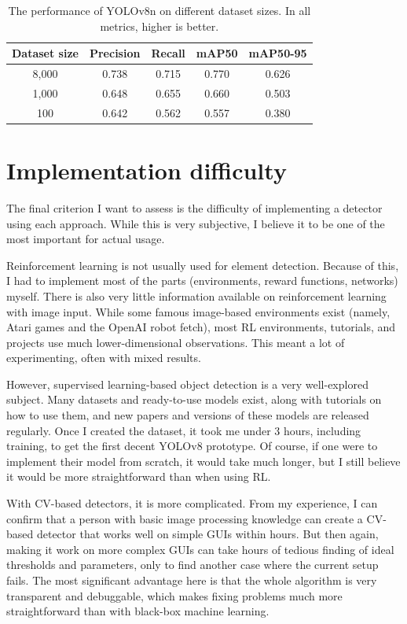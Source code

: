 \documentclass[
  digital,     %
  oneside,     %
  nosansbold,  %
  nocolorbold, %
  lof,         %
  lot,         %
]{fithesis4}
\begin{document}
\begin{table}
    \centering
    \begin{tabular}{c|cccc}
        Dataset size & Precision & Recall & mAP50 & mAP50-95 \\
         \hline
        8,000 & 0.738 & 0.715 & 0.770 & 0.626 \\
        1,000 & 0.648 & 0.655 & 0.660 & 0.503 \\
        100   & 0.642 & 0.562 & 0.557 & 0.380 \\
    \end{tabular}
    \caption{The performance of YOLOv8n on different dataset sizes. In all metrics, higher is better.}
    \label{tab:yolo_results}
\end{table}

\section{Implementation difficulty}

The final criterion I want to assess is the difficulty of implementing a detector using each approach. While this is very subjective, I believe it to be one of the most important for actual usage.

Reinforcement learning is not usually used for element detection. Because of this, I had to implement most of the parts (environments, reward functions, networks) myself. There is also very little information available on reinforcement learning with image input. While some famous image-based environments exist (namely, Atari games and the OpenAI robot fetch), most RL environments, tutorials, and projects use much lower-dimensional observations. This meant a lot of experimenting, often with mixed results.

However, supervised learning-based object detection is a very well-explored subject. Many datasets and ready-to-use models exist, along with tutorials on how to use them, and new papers and versions of these models are released regularly. Once I created the dataset, it took me under 3 hours, including training, to get the first decent YOLOv8 prototype. Of course, if one were to implement their model from scratch, it would take much longer, but I still believe it would be more straightforward than when using RL.

With CV-based detectors, it is more complicated. From my experience, I can confirm that a person with basic image processing knowledge can create a CV-based detector that works well on simple GUIs within hours. But then again, making it work on more complex GUIs can take hours of tedious finding of ideal thresholds and parameters, only to find another case where the current setup fails. The most significant advantage here is that the whole algorithm is very transparent and debuggable, which makes fixing problems much more straightforward than with black-box machine learning.
\end{document}
